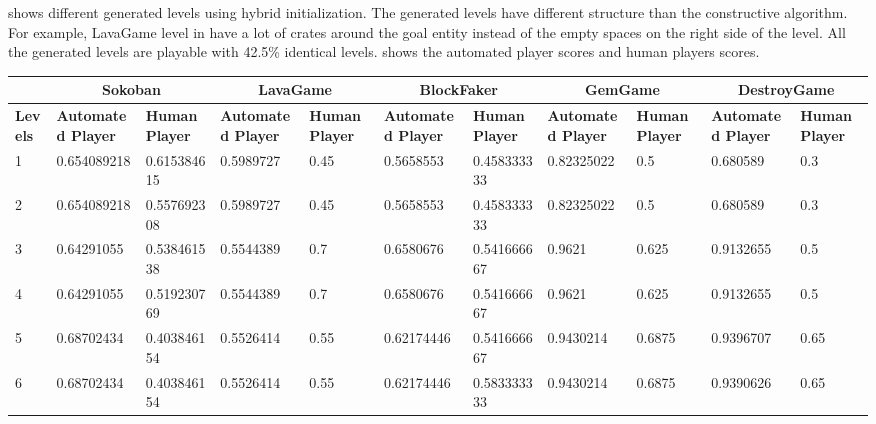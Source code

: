 
 shows different generated levels using hybrid initialization. The generated levels have different structure than the constructive algorithm. For example, LavaGame level in  have a lot of crates around the goal entity instead of the empty spaces on the right side of the level. All the generated levels are playable with 42.5\% identical levels.  shows the automated player scores and human players scores.


\begin{landscape}
\begin{table}[!ht]
	\centering
	\begin{tabular}{|p{0.5in}|p{0.75in}|p{0.75in}|p{0.75in}|p{0.75in}|p{0.75in}|p{0.75in}|p{0.75in}|p{0.75in}|p{0.75in}|p{0.75in}|}
		\hline
		& \multicolumn{2}{c}{\textbf{Sokoban}} & \multicolumn{2}{c}{\textbf{LavaGame}} & \multicolumn{2}{c}{\textbf{\textbf{BlockFaker}}} & \multicolumn{2}{c}{\textbf{GemGame}} & \multicolumn{2}{c}{\textbf{DestroyGame}}\\
		\hline
		\textbf{Levels} & \textbf{Automated Player} & \textbf{Human Player} & \textbf{Automated Player} & \textbf{Human Player} & \textbf{Automated Player} & \textbf{Human Player} & \textbf{Automated Player} & \textbf{Human Player} & \textbf{Automated Player} & \textbf{Human Player}\\
		\hline
		1 & 0.654089218 & 0.615384615 & 0.5989727 & 0.45 & 0.5658553 & 0.458333333 & 0.82325022 & 0.5 & 0.680589 & 0.3\\
		\hline
		2 & 0.654089218 & 0.557692308 & 0.5989727 & 0.45 & 0.5658553 & 0.458333333 & 0.82325022 & 0.5 & 0.680589 & 0.3\\
		\hline
		3 & 0.64291055 & 0.538461538 & 0.5544389 & 0.7 & 0.6580676 & 0.541666667 & 0.9621 & 0.625 & 0.9132655 & 0.5\\
		\hline
		4 & 0.64291055 & 0.519230769 & 0.5544389 & 0.7 & 0.6580676 & 0.541666667 & 0.9621 & 0.625 & 0.9132655 & 0.5\\
		\hline
		5 & 0.68702434 & 0.403846154 & 0.5526414 & 0.55 & 0.62174446 & 0.541666667 & 0.9430214 & 0.6875 & 0.9396707 & 0.65\\
		\hline
		6 & 0.68702434 & 0.403846154 & 0.5526414 & 0.55 & 0.62174446 & 0.583333333 & 0.9430214 & 0.6875 & 0.9390626 & 0.65\\

\end{tabular}
\end{table}
\end{landscape}
